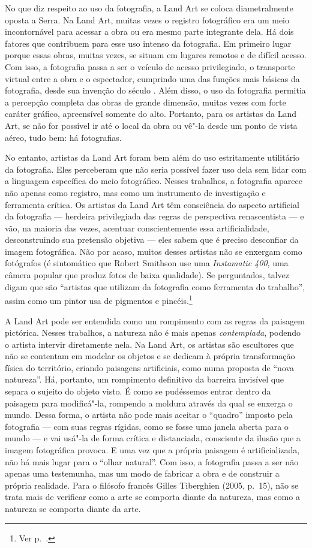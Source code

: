 No que diz respeito ao uso da fotografia, a Land Art se coloca
diametralmente oposta a Serra. Na Land Art, muitas vezes o registro
fotográfico era um meio incontornável para acessar a obra ou era mesmo
parte integrante dela. Há dois fatores que contribuem para esse uso
intenso da fotografia. Em primeiro lugar porque essas obras, muitas
vezes, se situam em lugares remotos e de difícil acesso. Com isso, a
fotografia passa a ser o veículo de acesso privilegiado, o transporte
virtual entre a obra e o espectador, cumprindo uma das funções mais
básicas da fotografia, desde sua invenção do século . Além disso, o
uso da fotografia permitia a percepção completa das obras de grande
dimensão, muitas vezes com forte caráter gráfico, apreensível somente
do alto. Portanto, para os artistas da Land Art, se não for
possível ir até o local da obra ou vê"-la desde um ponto de vista aéreo,
tudo bem: há fotografias.

No entanto, artistas da Land Art foram bem além do uso estritamente
utilitário da fotografia. Eles perceberam que não seria possível fazer
uso dela sem lidar com a linguagem específica do meio fotográfico.
Nesses trabalhos, a fotografia aparece não apenas como registro, mas
como um instrumento de investigação e ferramenta crítica. Os artistas da
Land Art têm consciência do aspecto artificial da fotografia --- herdeira
privilegiada das regras de perspectiva renascentista --- e vão, na
maioria das vezes, acentuar conscientemente essa artificialidade,
desconstruindo sua pretensão objetiva --- eles sabem que é preciso
desconfiar da imagem fotográfica. Não por acaso, muitos desses artistas
não se enxergam como fotógrafos (é sintomático que Robert Smithson use
uma \emph{Instamatic 400}, uma câmera popular que produz fotos de baixa
qualidade). Se perguntados, talvez digam que são ``artistas que utilizam
da fotografia como ferramenta do trabalho'', assim como um pintor usa de
pigmentos e pincéis.\footnote{Ver p.~\pageref{ferramenta}.}

A Land Art pode ser entendida como um rompimento com as regras da
paisagem pictórica. Nesses trabalhos, a natureza não é mais apenas
\emph{contemplada}, podendo o artista intervir diretamente nela. Na Land
Art, os artistas são escultores que não se contentam em modelar os
objetos e se dedicam à própria transformação física do território,
criando paisagens artificiais, como numa proposta de ``nova natureza''.
Há, portanto, um rompimento definitivo da barreira invisível que separa
o sujeito do objeto visto. É como se pudéssemos entrar dentro da
paisagem para modificá"-la, rompendo a moldura através da qual se enxerga
o mundo. Dessa forma, o artista não pode mais aceitar o ``quadro''
imposto pela fotografia --- com suas regras rígidas, como se fosse uma
janela aberta para o mundo --- e vai usá"-la de forma crítica e
distanciada, consciente da ilusão que a imagem fotográfica provoca. E
uma vez que a própria paisagem é artificializada, não há mais lugar para
o ``olhar natural''. Com isso, a fotografia passa a ser não apenas uma
testemunha, mas um modo de fabricar a obra e de construir a própria
realidade. Para o filósofo francês Gilles Tiberghien (2005, p.~15), não
se trata mais de verificar como a arte se comporta diante da natureza,
mas como a natureza se comporta diante da arte.

